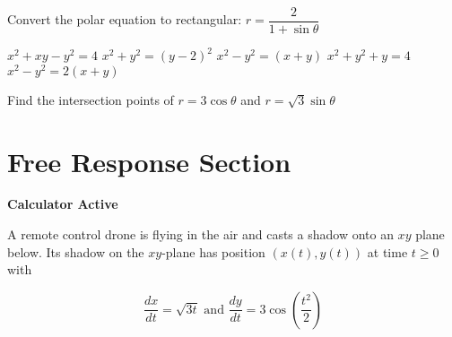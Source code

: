 \documentclass[11pt,answers]{exam}
\begin{document}
\begin{questions}
\begin{minipage}{\linewidth}
\question Convert the polar equation to rectangular: $r = \dfrac{2}{1 + \sin \theta}$

\begin{choices}
	\choice $x^2 + xy - y^2 = 4$
	\correctchoice $x^2 + y^2 = (y-2)^2$
	\choice $x^2 - y^2 = (x+y)$
	\choice $x^2+y^2 + y = 4$
	\choice $x^2 - y^2 = 2(x+y)$
\end{choices} \answerline
\end{minipage}

\begin{minipage}{\linewidth}


\question Find the intersection points of $r = 3 \cos \theta$ and $r = \sqrt3 \sin \theta$

\begin{choices}

\end{choices} \answerline
\end{minipage}

\end{questions}

\clearpage
\section*{Free Response Section}
\noindent
\textbf{Calculator Active}
\vspace{2ex}

A remote control drone is flying in the air and casts a shadow onto
an $xy$ plane below. Its shadow on the $x y$-plane has
position $(x(t), y(t))$ at time $t \geq 0$ with

$$
\frac{d x}{d t}=\sqrt{3 t} \text { and }
\frac{d y}{d t}=3 \cos \left(\frac{t^{2}}{2}\right)
$$
\end{document}
